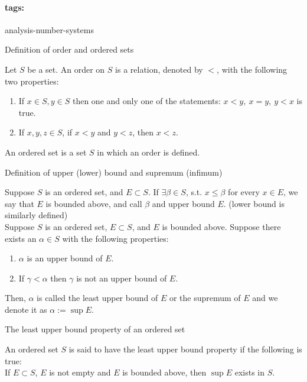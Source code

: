 \documentclass[11pt]{article}
\newcommand*{\tags}[1]{\paragraph{tags: }#1\bigskip}
\newcommand*{\xfield}[1]{\begin{mdframed}\centering #1\end{mdframed}\bigskip}
\newenvironment{field}{}{}
\newenvironment{note}{}{}
\begin{document}
\tags{analysis-number-systems}
%
\begin{note}
  \xfield{Definition of order and ordered sets}
  \begin{field}
    Let \(S\) be a set. An order on \(S\) is a relation, denoted by
    \(<\), with the following two properties:
    \begin{enumerate}
    \item If \(x \in S, y \in S\) then one and only one of the
      statements: \(x < y, ~ x = y, ~ y < x\) is true.
    \item If \(x,y,z \in S\), if \(x < y\) and \(y < z\), then \(x < z\).
    \end{enumerate}
    An ordered set is a set \(S\) in which an order is defined.
  \end{field}
\end{note}
%
\begin{note}
  \xfield{Definition of upper (lower) bound and supremum (infimum)}
  \begin{field}
    Suppose \(S\) is an ordered set, and \(E \subset S\). If
    \(\exists \beta \in S\), s.t. \(x \leq \beta\) for every
    \(x \in E\), we say that \(E\) is bounded above, and call
    \(\beta\) and upper bound \(E\). (lower bound is similarly
    defined)
    \\

    Suppose \(S\) is an ordered set, \(E \subset S\), and \(E\) is
    bounded above. Suppose there exists an \(\alpha \in S\) with the
    following properties:
    \begin{enumerate}
    \item \(\alpha\) is an upper bound of \(E\).
    \item If \(\gamma < \alpha\) then \(\gamma\) is not an upper
      bound of \(E\).
    \end{enumerate}
    Then, \(\alpha\) is called the least upper bound of \(E\) or the
    supremum of \(E\) and we denote it as \(\alpha := \sup E\).
  \end{field}
\end{note}
%
\begin{note}
  \xfield{The least upper bound property of an ordered set}
  \begin{field}
    An ordered set \(S\) is said to have the least upper bound
    property if the following is true:
    \\

    If \(E \subset S\), \(E\) is not empty and \(E\) is bounded above,
    then \(\sup E\) exists in \(S\).
  \end{field}
\end{note}
\end{document}
